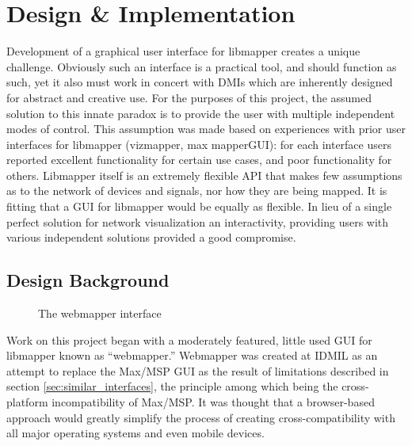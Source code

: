 \chapter{Design \& Implementation}

	Development of a graphical user interface for libmapper creates a unique challenge. Obviously such an interface is a practical tool, and should function as such, yet it also must work in concert with DMIs which are inherently designed for abstract and creative use. For the purposes of this project, the assumed solution to this innate paradox is to provide the user with multiple independent modes of control.  This assumption was made based on experiences with prior user interfaces for libmapper (vizmapper, max mapperGUI): for each interface users reported excellent functionality for certain use cases, and poor functionality for others. Libmapper itself is an extremely flexible API that makes few assumptions as to the network of devices and signals, nor how they are being mapped. It is fitting that a GUI for libmapper would be equally as flexible. In lieu of a single perfect solution for network visualization an interactivity, providing users with various independent solutions provided a good compromise.
	
\section{Design Background}

\begin{figure}[ht]
\centering
\caption{The webmapper interface}
\label{fig:webmapper}
\end{figure}

Work on this project began with a moderately featured, little used GUI for libmapper known as ``webmapper.'' Webmapper was created at IDMIL as an attempt to replace the Max/MSP GUI as the result of limitations described in section \ref{sec:similar_interfaces}, the principle among which being the cross-platform incompatibility of Max/MSP. It was thought that a browser-based approach would greatly simplify the process of creating cross-compatibility with all major operating systems and even mobile devices. 

